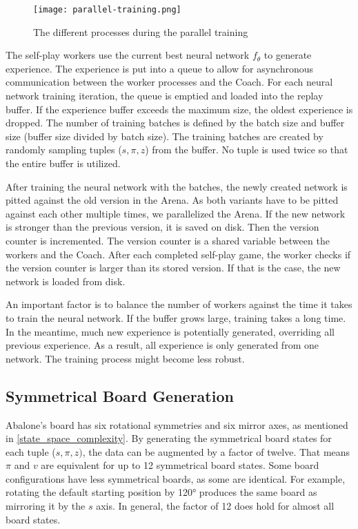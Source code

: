 \begin{figure}[H]
    \centering
    \texttt{[image: parallel-training.png]}
    \caption{The different processes during the parallel training \cite[cf. p. 45]{bruasdal_deep_2020}}
    \label{parallel_training_pipeline}
\end{figure}

The self-play workers use the current best neural network $f_{\theta}$ to generate experience. The experience is put into a queue to allow for asynchronous communication between the worker processes and the Coach. For each neural network training iteration, the queue is emptied and loaded into the replay buffer. If the experience buffer exceeds the maximum size, the oldest experience is dropped. The number of training batches is defined by the batch size and buffer size (buffer size divided by batch size). The training batches are created by randomly sampling tuples ($s, \pi, z$) from the buffer. No tuple is used twice so that the entire buffer is utilized.

After training the neural network with the batches, the newly created network is pitted against the old version in the Arena. As both variants have to be pitted against each other multiple times, we parallelized the Arena. If the new network is stronger than the previous version, it is saved on disk. Then the version counter is incremented. The version counter is a shared variable between the workers and the Coach. After each completed self-play game, the worker checks if the version counter is larger than its stored version. If that is the case, the new network is loaded from disk.

An important factor is to balance the number of workers against the time it takes to train the neural network. If the buffer grows large, training takes a long time. In the meantime, much new experience is potentially generated, overriding all previous experience. As a result, all experience is only generated from one network. The training process might become less robust.

\subsection{Symmetrical Board Generation}
Abalone's board has six rotational symmetries and six mirror axes, as mentioned in \ref{state_space_complexity}. By generating the symmetrical board states for each tuple ($s, \pi, z)$, the data can be augmented by a factor of twelve. That means $\pi$ and $v$ are equivalent for up to 12 symmetrical board states. Some board configurations have less symmetrical boards, as some are identical. For example, rotating the default starting position by 120° produces the same board as mirroring it by the $s$ axis. In general, the factor of 12 does hold for almost all board states.

